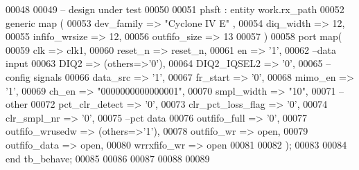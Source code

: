 \begin{DoxyCode}
00048     
00049 \textcolor{keyword}{          -- design under test  }
00050   
00051   phsft : \textcolor{keywordflow}{entity} work.rx_path 
00052 \textcolor{keywordflow}{generic} \textcolor{keywordflow}{map} (
00053         dev_family      => \textcolor{keyword}{"Cyclone IV E"}  ,
00054         diq_width       => \textcolor{vhdllogic}{12},
00055         infifo_wrsize   => \textcolor{vhdllogic}{12},
00056         outfifo_size    => \textcolor{vhdllogic}{13}
00057 \textcolor{vhdlchar}{)}
00058 \textcolor{keywordflow}{port} \textcolor{keywordflow}{map}(
00059         clk                 => clk1,
00060       reset_n               => reset_n,
00061         en                      => '1',
00062 \textcolor{keyword}{        --data input }
00063         DIQ2                    => \textcolor{vhdlchar}{(}\textcolor{keywordflow}{others}=>'0'\textcolor{vhdlchar}{)},
00064         DIQ2_IQSEL2         => '0',
00065 \textcolor{keyword}{        --config signals }
00066         data_src                => '1',
00067         fr_start                => '0',
00068         mimo_en             => '1',
00069         ch_en                   => "\textcolor{vhdllogic}{0000000000000001}",
00070         smpl_width          => "\textcolor{vhdllogic}{10}",
00071 \textcolor{keyword}{        --other}
00072         pct_clr_detect      => '0',
00073         clr_pct_loss_flag   => '0',
00074         clr_smpl_nr         => '0', 
00075 \textcolor{keyword}{        --pct data}
00076         outfifo_full        => '0',
00077         outfifo_wrusedw => \textcolor{vhdlchar}{(}\textcolor{keywordflow}{others}=>'1'\textcolor{vhdlchar}{)},
00078         outfifo_wr          => \textcolor{keywordflow}{open},
00079         outfifo_data        => \textcolor{keywordflow}{open},
00080         wrrxfifo_wr         => \textcolor{keywordflow}{open}
00081     
00082     \textcolor{vhdlchar}{)};
00083     
00084     \textcolor{keywordflow}{end} \textcolor{vhdlchar}{tb\_behave};
00085   
00086   
00087 
00088 
00089   
\end{DoxyCode}
